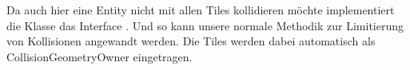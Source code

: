 Da auch hier eine Entity nicht mit allen Tiles kollidieren möchte implementiert die Klasse  das Interface . Und so kann unsere normale Methodik zur Limitierung von Kollisionen angewandt werden. Die Tiles werden dabei automatisch als CollisionGeometryOwner eingetragen.